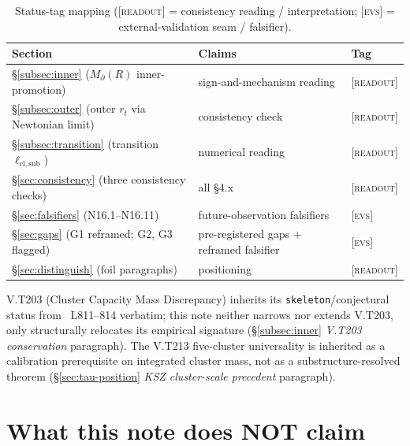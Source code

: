 \documentclass{pantarhei-researchnote}
\newcommand{\ellsub}{\ell_{\mathrm{cl},\mathrm{sub}}}  %
\newcommand{\Mpa}{M_{\partial}}                 %
\newcommand{\readout}{\textsc{[readout]}}
\newcommand{\evstag}{\textsc{[evs]}}
\renewcommand{\arraystretch}{1.2}
\begin{document}
\begin{table}[!h]
\footnotesize
\centering
\renewcommand{\arraystretch}{1.15}
\caption{Status-tag mapping (\readout{} = consistency reading / interpretation;
\evstag{} = external-validation seam / falsifier).}
\label{tab:status-mapping}
\begin{tabular}{@{}p{2.6cm} p{3.3cm} p{0.9cm}@{}}
\toprule
Section & Claims & Tag \\
\midrule
\S\ref{subsec:inner} ($\Mpa(R)$ inner-promotion)
  & sign-and-mechanism reading & \readout \\
\S\ref{subsec:outer} (outer $r_t$ via Newtonian limit)
  & consistency check & \readout \\
\S\ref{subsec:transition} (transition $\ellsub$)
  & numerical reading & \readout \\
\S\ref{sec:consistency} (three consistency checks)
  & all \S{}4.x & \readout \\
\S\ref{sec:falsifiers} (N16.1--N16.11)
  & future-observation falsifiers & \evstag \\
\S\ref{sec:gaps} (G1 reframed; G2, G3 flagged)
  & pre-registered gaps + reframed falsifier & \evstag \\
\S\ref{sec:distinguish} (foil paragraphs)
  & positioning & \readout \\
\bottomrule
\end{tabular}
\end{table}

\noindent
V.T203 (Cluster Capacity Mass Discrepancy) inherits its
\texttt{skeleton}/conjectural status from~\cite{KSZCategorical}
L811--814 verbatim; this note neither narrows nor extends V.T203, only
structurally relocates its empirical signature
(\S\ref{subsec:inner} \emph{V.T203 conservation} paragraph). The V.T213
five-cluster universality is inherited as a calibration prerequisite on
integrated cluster mass, not as a substructure-resolved theorem
(\S\ref{sec:tau-position} \emph{KSZ cluster-scale precedent} paragraph).


\section{What this note does NOT claim}\label{sec:non-claims}
\end{document}
